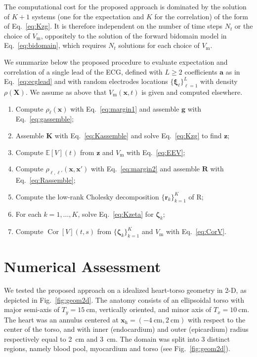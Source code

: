 \documentclass[runningheads]{llncs}
\newcommand{\bs}[1]{\boldsymbol{#1}}
\newcommand{\Vm}{V_\mathrm{m}}
\newcommand{\vX}{\mathbf{X}}
\newcommand{\vx}{\mathbf{x}}
\newcommand{\EE}{\mathbb{E}}
\DeclareMathOperator{\Cor}{Cor}
\begin{document}
The computational cost for the proposed approach is dominated
by the solution of $K+1$
systems (one for the expectation and $K$ for the correlation)
of the form of Eq.~\eqref{eq:Kzg}. It is therefore
independent on the number of time steps $N_t$ or the choice
of $\Vm$, oppositely to the
solution of the forward bidomain model in Eq.~\eqref{eq:bidomain},
which requires $N_t$ solutions for each choice of $\Vm$.

We summarize below the proposed procedure to evaluate expectation and correlation of a single lead
of the ECG, defined with $L \ge 2$ coefficients $\mathbf{a}$
as in Eq.~\eqref{eq:ecglead} and with random electrodes locations
$\{ \bs\xi_\ell \}_{\ell=1}^L$
with density $\rho(\vX)$. We assume as above that $\Vm(\vx,t)$ is given
and computed elsewhere.
\begin{enumerate}
\item Compute $\rho_\ell(\vx)$ with Eq.~\eqref{eq:margin1} and assemble $\mathbf{g}$ with Eq.~\eqref{eq:gassemble};
\item Assemble $\mathbf{K}$ with Eq.~\eqref{eq:Kassemble} and solve Eq.~\eqref{eq:Kzg} to find $\mathbf{z}$;
\item Compute $\EE[V](t)$ from $\mathbf{z}$ and $\Vm$ with Eq.~\eqref{eq:EEV};
\item Compute $\rho_{\ell,\ell'}(\vx,\vx')$ with Eq.~\eqref{eq:margin2} and assemble $\mathbf{R}$ with Eq.~\eqref{eq:Rassemble};
\item Compute the low-rank Cholesky decomposition $\{ \bs{r}_k \}_{k=1}^K$ of $\mathrm{R}$;
\item For each $k=1,\ldots,K$, solve Eq.~\eqref{eq:Kzeta} for $\bs\zeta_k$;
\item Compute $\Cor[V](t,s)$ from $\{ \bs{\zeta}_k \}_{k=1}^K$ and $\Vm$ with Eq.~\eqref{eq:CorV}.
\end{enumerate}

\section{Numerical Assessment}
\label{sec:exp}

We tested the proposed approach on a idealized heart-torso geometry in
2-D, as depicted in Fig.~\ref{fig:geom2d}.  The anatomy consists of an
ellipsoidal torso with major semi-axis of $T_y = \SI{15}{\cm}$, vertically oriented,
and minor axis of $T_x = \SI{10}{\cm}$.  The heart was an annulus centered at
$\vx_\mathrm{h}=(\SI{-4}{\cm}, \SI{2}{\cm})$ with respect to the center of the torso,
and with inner (endocardium) and outer (epicardium) radius respectively
equal to \SI{2}{\cm} and \SI{3}{\cm}.  The domain was split into 3 distinct
regions, namely blood pool, myocardium and torso (see Fig.~\ref{fig:geom2d}).
\end{document}
